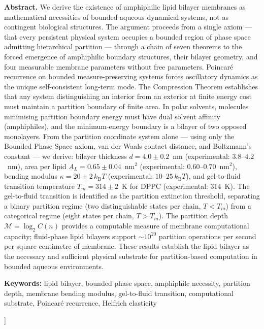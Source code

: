 \documentclass[11pt,twocolumn,a4paper]{article}
\theoremstyle{definition}
\theoremstyle{remark}
\newcommand{\kB}{k_{\mathrm{B}}}
\newcommand{\Mpart}{\mathcal{M}}
\begin{document}
\begin{@twocolumnfalse}
\begin{center}
\begin{minipage}{0.92\textwidth}
\textbf{Abstract.}
We derive the existence of amphiphilic lipid bilayer membranes as mathematical
necessities of bounded aqueous dynamical systems, not as contingent biological
structures. The argument proceeds from a single axiom --- that every persistent
physical system occupies a bounded region of phase space admitting hierarchical
partition --- through a chain of seven theorems to the forced emergence of
amphiphilic boundary structures, their bilayer geometry, and four measurable
membrane parameters without free parameters. Poincar\'{e} recurrence on bounded
measure-preserving systems forces oscillatory dynamics as the unique
self-consistent long-term mode. The Compression Theorem establishes that any
system distinguishing an interior from an exterior at finite energy cost must
maintain a partition boundary of finite area. In polar solvents, molecules
minimising partition boundary energy must have dual solvent affinity
(amphiphiles), and the minimum-energy boundary is a bilayer of two opposed
monolayers. From the partition coordinate system alone --- using only the
Bounded Phase Space axiom, van der Waals contact distance, and
Boltzmann's constant --- we derive: bilayer thickness $d = 4.0 \pm 0.2$~nm
(experimental: $3.8$--$4.2$~nm), area per lipid $A_L = 0.65 \pm 0.04$~nm$^2$
(experimental: $0.60$--$0.70$~nm$^2$), bending modulus
$\kappa = 20 \pm 2\,\kB T$ (experimental: $10$--$25\,\kB T$), and
gel-to-fluid transition temperature $T_m = 314 \pm 2$~K for DPPC
(experimental: $314$~K). The gel-to-fluid transition is identified as the
partition extinction threshold, separating a binary partition regime
(two distinguishable states per chain, $T < T_m$) from a categorical regime
(eight states per chain, $T > T_m$). The partition depth $\Mpart = \log_2 C(n)$
provides a computable measure of membrane computational capacity; fluid-phase
lipid bilayers support ${\sim}10^{20}$ partition operations per second per
square centimetre of membrane. These results establish the lipid bilayer as the
necessary and sufficient physical substrate for partition-based computation in
bounded aqueous environments.

\vspace{8pt}
\noindent\textbf{Keywords:}
lipid bilayer, bounded phase space, amphiphile necessity, partition depth,
membrane bending modulus, gel-to-fluid transition, computational substrate,
Poincar\'{e} recurrence, Helfrich elasticity
\end{minipage}

\vspace{18pt}
\end{center}
\end{@twocolumnfalse}
]
\end{document}
